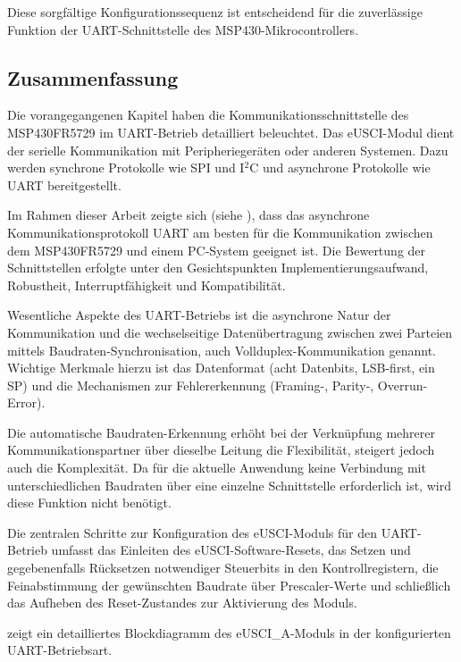Diese sorgf\"altige Konfigurationssequenz ist entscheidend f\"ur die zuverl\"assige Funktion der UART-Schnittstelle des MSP430-Mikrocontrollers.

\newpage
\subsection{Zusammenfassung}
\label{sec:eUSCI_Zusammenfassung}

Die vorangegangenen Kapitel haben die Kommunikationsschnittstelle des MSP430FR5729 im UART-Betrieb detailliert beleuchtet. Das eUSCI-Modul dient der serielle Kommunikation mit Peripherieger\"aten oder anderen Systemen. Dazu werden synchrone Protokolle wie SPI und I$^{2}$C und asynchrone Protokolle wie UART bereitgestellt.

Im Rahmen dieser Arbeit zeigte sich (siehe ), dass das asynchrone Kommunikationsprotokoll UART am besten f\"ur die Kommunikation zwischen dem MSP430FR5729 und einem PC-System geeignet ist. Die Bewertung der Schnittstellen erfolgte unter den Gesichtspunkten Implementierungsaufwand, Robustheit, Interruptf\"ahigkeit und Kompatibilit\"at.

Wesentliche Aspekte des UART-Betriebs ist die asynchrone Natur der Kommunikation und die wechselseitige Daten\"ubertragung zwischen zwei Parteien mittels Baudraten-Synchronisation, auch Vollduplex-Kommunikation genannt. Wichtige Merkmale hierzu ist das Datenformat (\zB acht Datenbits, LSB-first, ein SP) und die Mechanismen zur Fehlererkennung (\zB Framing-, Parity-, Overrun-Error).

Die automatische Baudraten-Erkennung erh\"oht bei der Verkn\"upfung mehrerer Kommunikationspartner \"uber dieselbe Leitung die Flexibilit\"at, steigert jedoch auch die Komplexit\"at. Da f\"ur die aktuelle Anwendung keine Verbindung mit unterschiedlichen Baudraten \"uber eine einzelne Schnittstelle erforderlich ist, wird diese Funktion nicht ben\"otigt.

Die zentralen Schritte zur Konfiguration des eUSCI-Moduls f\"ur den UART-Betrieb umfasst das Einleiten des eUSCI-Software-Resets, das Setzen und gegebenenfalls R\"ucksetzen notwendiger Steuerbits in den Kontrollregistern, die Feinabstimmung der gew\"unschten Baudrate \"uber Prescaler-Werte und schlie{\ss}lich das Aufheben des Reset-Zustandes zur Aktivierung des Moduls.

 zeigt ein detailliertes Blockdiagramm des eUSCI\_A-Moduls in der konfigurierten UART-Betriebsart.

